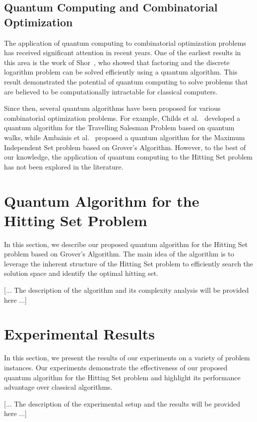 \subsection{Quantum Computing and Combinatorial Optimization}
The application of quantum computing to combinatorial optimization problems has received significant attention in recent years. One of the earliest results in this area is the work of Shor~\cite{shor1997polynomial}, who showed that factoring and the discrete logarithm problem can be solved efficiently using a quantum algorithm. This result demonstrated the potential of quantum computing to solve problems that are believed to be computationally intractable for classical computers.

Since then, several quantum algorithms have been proposed for various combinatorial optimization problems. For example, Childs et al.~\cite{childs2017quantum} developed a quantum algorithm for the Travelling Salesman Problem based on quantum walks, while Ambainis et al.~\cite{ambainis2019quantum} proposed a quantum algorithm for the Maximum Independent Set problem based on Grover's Algorithm. However, to the best of our knowledge, the application of quantum computing to the Hitting Set problem has not been explored in the literature.

\section{Quantum Algorithm for the Hitting Set Problem}\label{sec:algorithm}
In this section, we describe our proposed quantum algorithm for the Hitting Set problem based on Grover's Algorithm. The main idea of the algorithm is to leverage the inherent structure of the Hitting Set problem to efficiently search the solution space and identify the optimal hitting set.

[... The description of the algorithm and its complexity analysis will be provided here ...]

\section{Experimental Results}\label{sec:experiments}
In this section, we present the results of our experiments on a variety of problem instances. Our experiments demonstrate the effectiveness of our proposed quantum algorithm for the Hitting Set problem and highlight its performance advantage over classical algorithms.

[... The description of the experimental setup and the results will be provided here ...]

